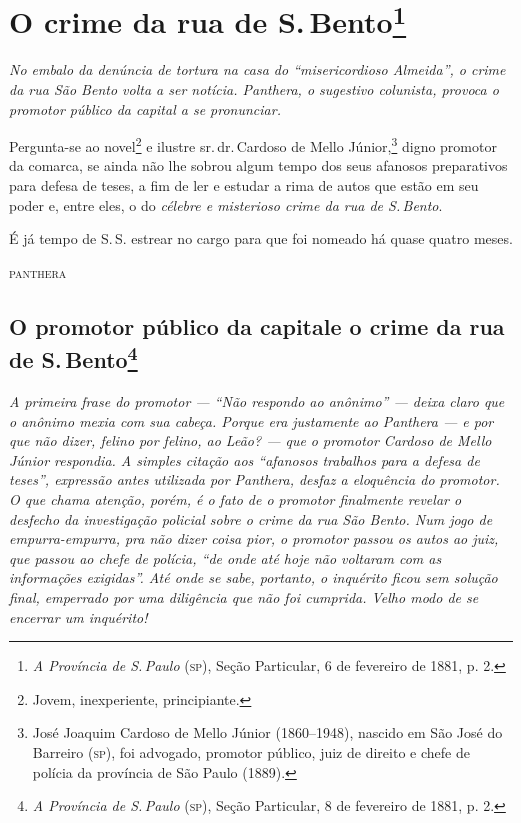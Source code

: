 \chapter{O crime da rua de S.\,Bento\footnote{\emph{A Província
  de S.\,Paulo} (\textsc{sp}), Seção Particular, 6 de fevereiro de 1881, p. 2.}}

\begin{resumo}
\emph{No embalo da denúncia de tortura na casa do ``misericordioso
Almeida'', o crime da rua São Bento volta a ser notícia. Panthera,
o sugestivo colunista, provoca o promotor público da capital a se
pronunciar. }
\end{resumo}

Pergunta-se ao novel\footnote{Jovem, inexperiente, principiante.} e
ilustre sr.\,dr.\,Cardoso de Mello Júnior,\footnote{José Joaquim Cardoso \label{jjcmj}
  de Mello Júnior (1860--1948), nascido em São José do Barreiro (\textsc{sp}), foi
  advogado, promotor público, juiz de direito e chefe de polícia da
  província de São Paulo (1889).}
digno promotor da comarca,
se ainda não lhe sobrou algum tempo dos seus afanosos preparativos para
defesa de teses, a fim de ler e estudar a rima de autos que estão em seu
poder e, entre eles, o do \emph{célebre e misterioso crime da rua de S.\,Bento}.

É já tempo de S.\,S. estrear no cargo para que foi nomeado há quase
quatro meses.

\hfill\textsc{panthera}

\pagebreak
\section{O promotor público da capital\break e o crime da rua de S.\,Bento\protect\footnote{\emph{\MakeUppercase{A} \MakeUppercase{P}rovíncia de \MakeUppercase{S.\,P}aulo} (\textsc{sp}), \MakeUppercase{S}eção 
\MakeUppercase{P}articular, 8 de fevereiro de 1881, p. 2.}}

\begin{resumo}
\emph{A primeira frase do promotor --- ``Não respondo ao anônimo'' --- deixa
claro que o anônimo mexia com sua cabeça. Porque era justamente ao
Panthera --- e por que não dizer, felino por felino, ao
Leão? --- que o promotor Cardoso de Mello Júnior respondia. A
simples citação aos ``afanosos trabalhos para a defesa de teses'',
expressão antes utilizada por Panthera, desfaz a eloquência do
promotor. O que chama atenção, porém, é o fato de o promotor finalmente
revelar o desfecho da investigação policial sobre o crime da rua São
Bento. Num jogo de empurra-empurra, pra não dizer coisa pior, o promotor
passou os autos ao juiz, que passou ao chefe de polícia, ``de onde até
hoje não voltaram com as informações exigidas''. Até onde se sabe,
portanto, o inquérito ficou sem solução final, emperrado por uma
diligência que não foi cumprida. Velho modo de se encerrar um
inquérito!}
\end{resumo}

